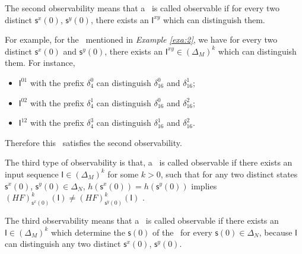 The second observability means that a \BCN\ is called observable if for every two distinct $\mathsf{s}^{x}(0)$, $\mathsf{s}^{y}(0)$, there exists an $\mathsf{I}^{xy}$ which can distinguish them. %
\begin{example}
For example, for the \BCN\ mentioned in {\em Example \ref{exa:2}}, we have for every two distinct $\mathsf{s}^{x}(0)$ and $\mathsf{s}^{y}(0)$, there exists an $\mathsf{I}^{xy}\in(\Delta_M)^k$ which can distinguish them.  For instance,
\begin{itemize}
  \item $\mathsf{I}^{01}$ with the prefix $\delta_{4}^0$ can distinguish $\delta_{16}^0$ and $\delta_{16}^1$;
  \item $\mathsf{I}^{02}$ with the prefix $\delta_{4}^1$ can distinguish $\delta_{16}^0$ and $\delta_{16}^2$;
  \item $\mathsf{I}^{12}$ with the prefix $\delta_{4}^3$ can distinguish $\delta_{16}^1$ and $\delta_{16}^2$.
\end{itemize} 
Therefore this \BCN\ satisfies the second observability.
\label{exa:5}
\end{example}   
\begin{definition}
The third type of observability is that, a \BCN\ is called observable if there exists an input sequence $\mathsf{I}\in(\Delta_M)^k$ for some $k>0$, such that for any two distinct states $\mathsf{s}^{x}(0)$, $\mathsf{s}^{y}(0) \in \Delta_N$, $h(\mathsf{s}^{x}(0))=h(\mathsf{s}^{y}(0))$ implies $(HF)^k_{\mathsf{s}^{x}(0)}(\mathsf{I})\neq (HF)^k_{\mathsf{s}^{y}(0)}(\mathsf{I})$ \cite{Cheng2011Identification}.
\end{definition}

The third observability means that a \BCN\ is called observable if there exists an $\mathsf{I}\in(\Delta_M)^k$ which determine the $\mathsf{s}(0)$ of the \BCN\ for every $\mathsf{s}(0)\in\Delta_N$, because $\mathsf{I}$ can distinguish any two distinct $\mathsf{s}^{x}(0)$, $\mathsf{s}^{y}(0)$.%

